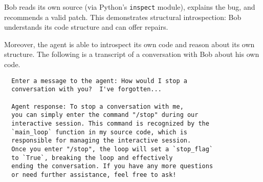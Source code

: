 \documentclass[11pt]{article}
\begin{document}
Bob reads its own source (via Python’s \texttt{inspect} module), explains the bug, 
and recommends a valid patch. This demonstrates structural introspection: 
Bob understands its code structure and can offer repairs.

Moreover, the agent is able to introspect its own code and reason 
about its own structure.  The following is a transcript of a conversation with Bob about his own code.

\begin{verbatim}
  Enter a message to the agent: How would I stop a 
  conversation with you?  I've forgotten...

  Agent response: To stop a conversation with me, 
  you can simply enter the command "/stop" during our 
  interactive session. This command is recognized by the 
  `main_loop` function in my source code, which is 
  responsible for managing the interactive session. 
  Once you enter "/stop", the loop will set a `stop_flag` 
  to `True`, breaking the loop and effectively 
  ending the conversation. If you have any more questions 
  or need further assistance, feel free to ask!
  \end{verbatim}
\end{document}
